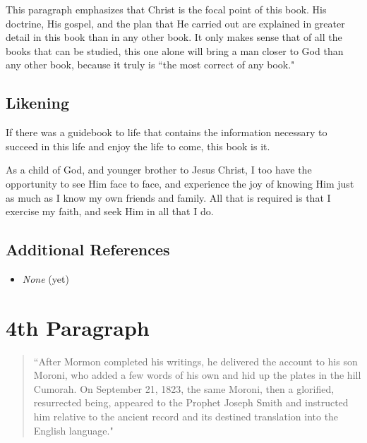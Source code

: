\documentclass[12pt]{report}
\begin{document}
This paragraph emphasizes that Christ is the focal point of this book.  His doctrine, His gospel, and the plan that He carried out are explained in greater detail in this book than in any other book.  It only makes sense that of all the books that can be studied, this one alone will bring a man closer to God than any other book, because it truly is ``the most correct of any book."

\subsection{Likening\label{intro:likening3}}
If there was a guidebook to life that contains the information necessary to succeed in this life and enjoy the life to come, this book is it.

As a child of God, and younger brother to Jesus Christ, I too have the opportunity to see Him face to face, and experience the joy of knowing Him just as much as I know my own friends and family.  All that is required is that I exercise my faith, and seek Him in all that I do.

\subsection{Additional References\label{intro:references3}}
\begin{itemize}
\item \emph{None} (yet)
\end{itemize}

\section{4th Paragraph\label{intro:4th}}
\begin{center}
\begin{quote}
``After Mormon completed his writings, he delivered the account to his son Moroni, who added a few words of his own and hid up the plates in the hill Cumorah.  On September 21, 1823, the same Moroni, then a glorified, resurrected being, appeared to the Prophet Joseph Smith and instructed him relative to the ancient record and its destined translation into the English language."
\end{quote}
\end{center}
\end{document}
